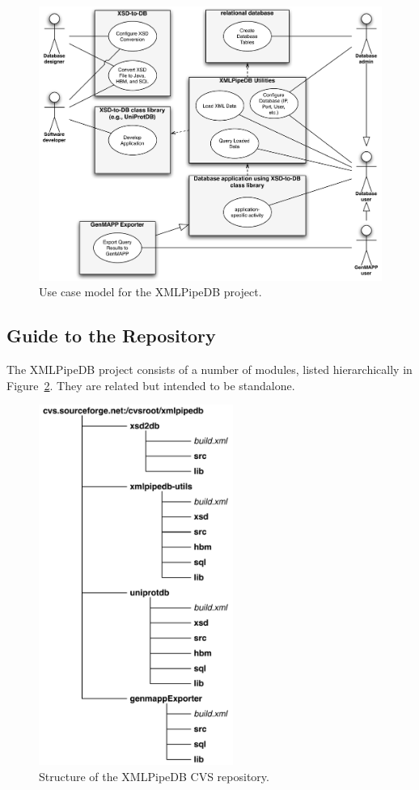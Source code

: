 \documentclass[11pt]{article}
\begin{document}
\begin{figure}[htbp] %
   \centering
   \includegraphics[width=5.5in]{figures/use-cases.pdf} 
   \caption{Use case model for the XMLPipeDB project.}
   \label{usecase}
\end{figure}

\subsection{Guide to the Repository}

The XMLPipeDB project consists of a number of modules, listed hierarchically in Figure~\ref{cvs}.  They are related but intended to be standalone.

\begin{figure}[htbp] %
   \centering
   \includegraphics[width=2.5in]{figures/cvs.pdf} 
   \caption{Structure of the XMLPipeDB CVS repository.}
   \label{cvs}
\end{figure}
\end{document}
